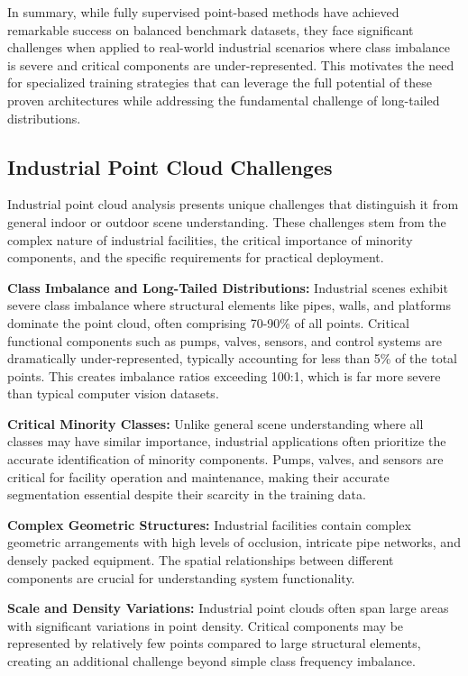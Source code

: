 \documentclass[preprint,12pt]{elsarticle}
\begin{document}
In summary, while fully supervised point-based methods have achieved remarkable success on balanced benchmark datasets, they face significant challenges when applied to real-world industrial scenarios where class imbalance is severe and critical components are under-represented. This motivates the need for specialized training strategies that can leverage the full potential of these proven architectures while addressing the fundamental challenge of long-tailed distributions.

\subsection{Industrial Point Cloud Challenges}
\label{sec:industrial_challenges}

Industrial point cloud analysis presents unique challenges that distinguish it from general indoor or outdoor scene understanding. These challenges stem from the complex nature of industrial facilities, the critical importance of minority components, and the specific requirements for practical deployment.

\textbf{Class Imbalance and Long-Tailed Distributions:} Industrial scenes exhibit severe class imbalance where structural elements like pipes, walls, and platforms dominate the point cloud, often comprising 70-90\% of all points. Critical functional components such as pumps, valves, sensors, and control systems are dramatically under-represented, typically accounting for less than 5\% of the total points. This creates imbalance ratios exceeding 100:1, which is far more severe than typical computer vision datasets.

\textbf{Critical Minority Classes:} Unlike general scene understanding where all classes may have similar importance, industrial applications often prioritize the accurate identification of minority components. Pumps, valves, and sensors are critical for facility operation and maintenance, making their accurate segmentation essential despite their scarcity in the training data.

\textbf{Complex Geometric Structures:} Industrial facilities contain complex geometric arrangements with high levels of occlusion, intricate pipe networks, and densely packed equipment. The spatial relationships between different components are crucial for understanding system functionality.

\textbf{Scale and Density Variations:} Industrial point clouds often span large areas with significant variations in point density. Critical components may be represented by relatively few points compared to large structural elements, creating an additional challenge beyond simple class frequency imbalance.
\end{document}
